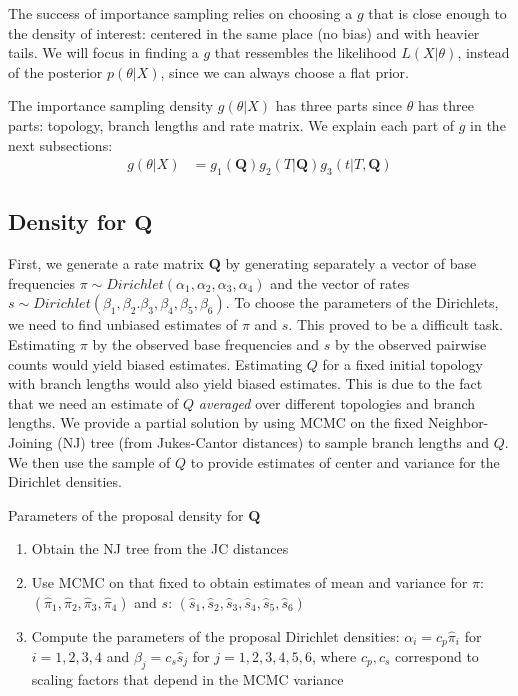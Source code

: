\documentclass[conference]{IEEEtran}
\begin{document}
The success of importance sampling relies on choosing a $g$ that is
close enough to the density of interest: centered in the same place
(no bias) and with heavier tails. We will focus in finding a $g$ that
ressembles the likelihood $L(X|\theta)$, instead of the posterior
$p(\theta|X)$, since we can always choose a flat prior.

The importance sampling density $g(\theta|X)$ has three parts since
$\theta$ has three parts: topology, branch lengths and rate matrix. We
explain each part of $g$ in the next subsections:
\begin{align*}
g(\theta|X) &= g_1(\mathbf{Q})g_2(T|\mathbf{Q})g_3(t|T,\mathbf{Q})
\end{align*}

\subsection*{Density for $\mathbf{Q}$}
First, we generate a rate matrix $\mathbf{Q}$ by generating separately
a vector of base frequencies $\pi\sim
Dirichlet(\alpha_1,\alpha_2,\alpha_3,\alpha_4)$ and the vector of
rates $s\sim
Dirichlet(\beta_1,\beta_2.\beta_3,\beta_4,\beta_5,\beta_6)$. To choose
the parameters of the Dirichlets, we need to find unbiased estimates
of $\pi$ and $s$. This proved to be a difficult task. Estimating $\pi$
by the observed base frequencies and $s$ by the observed pairwise
counts would yield biased estimates. Estimating $Q$ for a fixed
initial topology with branch lengths would also yield biased
estimates. This is due to the fact that we need an estimate of $Q$
\textit{averaged} over different topologies and branch lengths.
We provide a partial solution by using MCMC on the fixed
Neighbor-Joining (NJ) tree (from Jukes-Cantor distances) to sample branch
lengths and $Q$. We then use the sample of $Q$ to provide estimates of
center and variance for the Dirichlet densities.

\begin{algorithm}
\caption{Parameters of the proposal density for $\mathbf{Q}$}
\begin{enumerate}
\item{Obtain the NJ tree from the JC distances}
\item{Use MCMC on that fixed to obtain estimates of mean and variance
    for $\pi$: $(\hat{\pi}_1,\hat{\pi}_2,\hat{\pi}_3,\hat{\pi}_4)$ and
    $s$: $(\hat{s}_1,\hat{s}_2,\hat{s}_3,\hat{s}_4,\hat{s}_5,\hat{s}_6)$}
\item{Compute the parameters of the proposal Dirichlet densities:
    $\alpha_i=c_p\hat{\pi}_i$ for $i=1,2,3,4$ and
    $\beta_j=c_s\hat{s}_j$ for $j=1,2,3,4,5,6$, where $c_p,c_s$
    correspond to scaling factors that depend in the MCMC variance}
\end{enumerate}
\end{algorithm}
\end{document}

